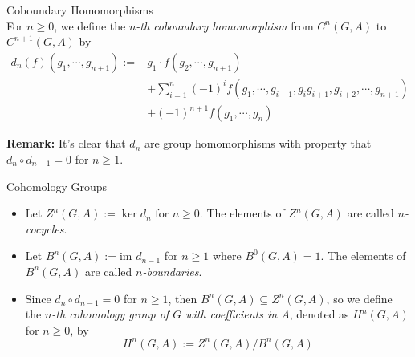 \begin{definition}{Coboundary Homomorphisms}\\
For $n\geq 0$, we define the \textit{$n$-th coboundary homomorphism} from $C^n(G,A)$ to $C^{n+1} (G,A)$ by
\begin{align*}
    d_n(f) (g_1 ,\cdots, g_{n+1}) := &g_1\cdot f(g_2, \cdots, g_{n+1})\\
    &+\sum_{i=1}^n (-1)^i f(g_1 ,\cdots, g_{i-1} ,g_ig_{i+1} ,g_{i+2} ,\cdots, g_{n+1})\\
    &+(-1)^{n+1} f(g_1 ,\cdots, g_n)
\end{align*}
\end{definition}

\noindent\textbf{Remark:} It's clear that $d_n$ are group homomorphisms with property that $d_n \circ d_{n-1}=0$ for $n\geq 1$.

\begin{definition}{Cohomology Groups}\\
\begin{itemize}
    \item Let $Z^n(G,A):= \ker d_n$ for $n\geq0$. The elements of $Z^n (G,A)$ are called \textit{$n$-cocycles}.
    \item Let $B^n(G,A):= \text{im }d_{n-1}$ for $n\geq 1$ where $B^0 (G,A)=1$. The elements of $B^n(G,A)$ are called \textit{$n$-boundaries}.
    \item Since $d_n\circ d_{n-1}=0$ for $n\geq 1$, then $B^n(G,A) \subseteq Z^n(G,A)$, so we define the \textit{$n$-th cohomology group of $G$ with coefficients in $A$}, denoted as $H^n(G,A)$ for $n\geq 0$, by
    \[
    H^n(G,A) := Z^n(G,A)/ B^n(G,A)
    \]
\end{itemize}
\end{definition}


